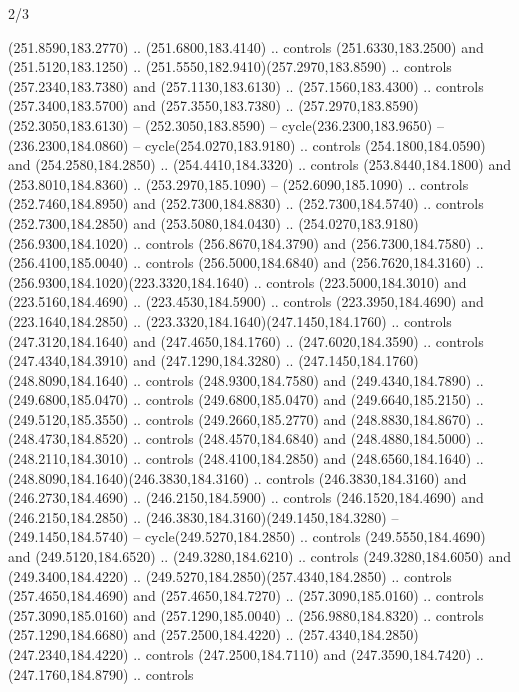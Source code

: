 \begin{flagdescription}{2/3}
\begin{scope}[xshift=0.5\flaglength,yshift=0.5\flagwidth,scale=\flagwidth/259.2]
\begin{scope}[y=0.8pt, x=0.8pt, yscale=-1,shift={(-243,-162)}]
      (251.8590,183.2770) .. (251.6800,183.4140) .. controls (251.6330,183.2500) and
      (251.5120,183.1250) .. (251.5550,182.9410)(257.2970,183.8590) .. controls
      (257.2340,183.7380) and (257.1130,183.6130) .. (257.1560,183.4300) .. controls
      (257.3400,183.5700) and (257.3550,183.7380) ..
      (257.2970,183.8590)(252.3050,183.6130) -- (252.3050,183.8590) --
      cycle(236.2300,183.9650) -- (236.2300,184.0860) -- cycle(254.0270,183.9180) ..
      controls (254.1800,184.0590) and (254.2580,184.2850) .. (254.4410,184.3320) ..
      controls (253.8440,184.1800) and (253.8010,184.8360) .. (253.2970,185.1090) --
      (252.6090,185.1090) .. controls (252.7460,184.8950) and (252.7300,184.8830) ..
      (252.7300,184.5740) .. controls (252.7300,184.2850) and (253.5080,184.0430) ..
      (254.0270,183.9180)(256.9300,184.1020) .. controls (256.8670,184.3790) and
      (256.7300,184.7580) .. (256.4100,185.0040) .. controls (256.5000,184.6840) and
      (256.7620,184.3160) .. (256.9300,184.1020)(223.3320,184.1640) .. controls
      (223.5000,184.3010) and (223.5160,184.4690) .. (223.4530,184.5900) .. controls
      (223.3950,184.4690) and (223.1640,184.2850) ..
      (223.3320,184.1640)(247.1450,184.1760) .. controls (247.3120,184.1640) and
      (247.4650,184.1760) .. (247.6020,184.3590) .. controls (247.4340,184.3910) and
      (247.1290,184.3280) .. (247.1450,184.1760)(248.8090,184.1640) .. controls
      (248.9300,184.7580) and (249.4340,184.7890) .. (249.6800,185.0470) .. controls
      (249.6800,185.0470) and (249.6640,185.2150) .. (249.5120,185.3550) .. controls
      (249.2660,185.2770) and (248.8830,184.8670) .. (248.4730,184.8520) .. controls
      (248.4570,184.6840) and (248.4880,184.5000) .. (248.2110,184.3010) .. controls
      (248.4100,184.2850) and (248.6560,184.1640) ..
      (248.8090,184.1640)(246.3830,184.3160) .. controls (246.3830,184.3160) and
      (246.2730,184.4690) .. (246.2150,184.5900) .. controls (246.1520,184.4690) and
      (246.2150,184.2850) .. (246.3830,184.3160)(249.1450,184.3280) --
      (249.1450,184.5740) -- cycle(249.5270,184.2850) .. controls
      (249.5550,184.4690) and (249.5120,184.6520) .. (249.3280,184.6210) .. controls
      (249.3280,184.6050) and (249.3400,184.4220) ..
      (249.5270,184.2850)(257.4340,184.2850) .. controls (257.4650,184.4690) and
      (257.4650,184.7270) .. (257.3090,185.0160) .. controls (257.3090,185.0160) and
      (257.1290,185.0040) .. (256.9880,184.8320) .. controls (257.1290,184.6680) and
      (257.2500,184.4220) .. (257.4340,184.2850)(247.2340,184.4220) .. controls
      (247.2500,184.7110) and (247.3590,184.7420) .. (247.1760,184.8790) .. controls

\end{scope}
\end{scope}
\end{flagdescription}
